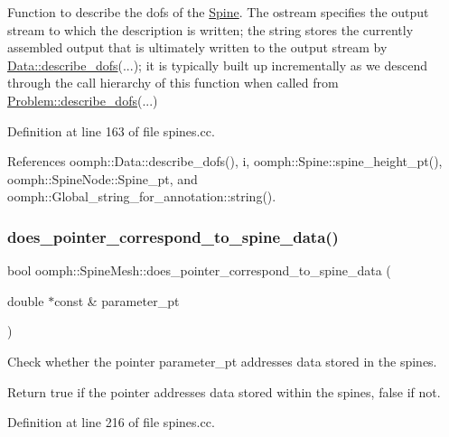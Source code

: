 Function to describe the dofs of the \hyperlink{classoomph_1_1Spine}{Spine}. The ostream specifies the output stream to which the description is written; the string stores the currently assembled output that is ultimately written to the output stream by \hyperlink{classoomph_1_1Data_a2dae16e2dcff9a40029f834c83364df5}{Data\+::describe\+\_\+dofs}(...); it is typically built up incrementally as we descend through the call hierarchy of this function when called from \hyperlink{classoomph_1_1Problem_abc103804eb319ae0b3d43870cc3e1eaf}{Problem\+::describe\+\_\+dofs}(...) 



Definition at line 163 of file spines.\+cc.



References oomph\+::\+Data\+::describe\+\_\+dofs(), i, oomph\+::\+Spine\+::spine\+\_\+height\+\_\+pt(), oomph\+::\+Spine\+Node\+::\+Spine\+\_\+pt, and oomph\+::\+Global\+\_\+string\+\_\+for\+\_\+annotation\+::string().

\mbox{\label{classoomph_1_1SpineMesh_a85444e7f6883f0540c75fd5f4cd9abe4}} 
\subsubsection{\texorpdfstring{does\+\_\+pointer\+\_\+correspond\+\_\+to\+\_\+spine\+\_\+data()}{does\_pointer\_correspond\_to\_spine\_data()}}
{\footnotesize\ttfamily bool oomph\+::\+Spine\+Mesh\+::does\+\_\+pointer\+\_\+correspond\+\_\+to\+\_\+spine\+\_\+data (\begin{DoxyParamCaption}\item[{double $\ast$const \&}]{parameter\+\_\+pt }\end{DoxyParamCaption})}



Check whether the pointer parameter\+\_\+pt addresses data stored in the spines. 

Return true if the pointer addresses data stored within the spines, false if not. 

Definition at line 216 of file spines.\+cc.



